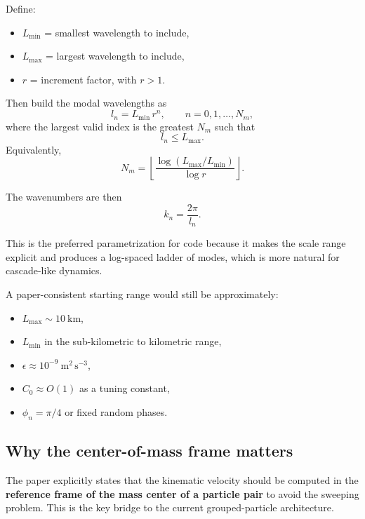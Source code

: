 \documentclass[11pt,a4paper]{article}
\begin{document}
	Define:
	\begin{itemize}[leftmargin=1.5em]
		\item $L_{\min}$ = smallest wavelength to include,
		\item $L_{\max}$ = largest wavelength to include,
		\item $r$ = increment factor, with $r>1$.
	\end{itemize}
	
	Then build the modal wavelengths as
	\begin{equation}
		l_n = L_{\min} \, r^n, \qquad n=0,1,\dots,N_m,
	\end{equation}
	where the largest valid index is the greatest $N_m$ such that
	\begin{equation}
		l_n \le L_{\max}.
	\end{equation}
	Equivalently,
	\begin{equation}
		N_m = \left\lfloor \frac{\log(L_{\max}/L_{\min})}{\log r} \right\rfloor.
	\end{equation}
	
	The wavenumbers are then
	\begin{equation}
		k_n = \frac{2\pi}{l_n}.
	\end{equation}
	
	This is the preferred parametrization for code because it makes the scale range explicit and produces a log-spaced ladder of modes, which is more natural for cascade-like dynamics.
	
	A paper-consistent starting range would still be approximately:
	\begin{itemize}[leftmargin=1.5em]
		\item $L_{\max} \sim 10\ \mathrm{km}$,
		\item $L_{\min}$ in the sub-kilometric to kilometric range,
		\item $\epsilon \approx 10^{-9}\ \mathrm{m}^2\,\mathrm{s}^{-3}$,
		\item $C_0 \approx O(1)$ as a tuning constant,
		\item $\phi_n = \pi/4$ or fixed random phases.
	\end{itemize}
	
	\subsection{Why the center-of-mass frame matters}
	
	The paper explicitly states that the kinematic velocity should be computed in the \textbf{reference frame of the mass center of a particle pair} to avoid the sweeping problem. This is the key bridge to the current grouped-particle architecture.
	
\end{document}
